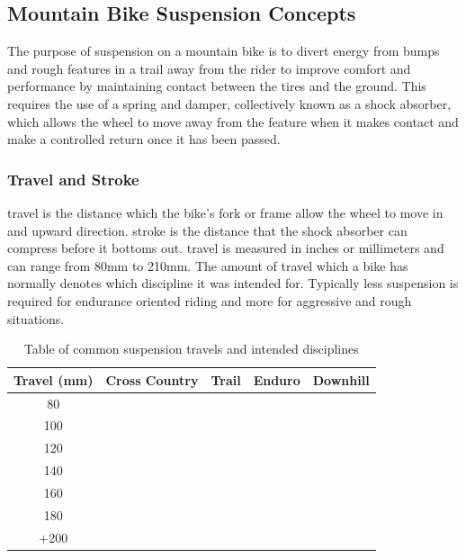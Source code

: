 	\subsection{Mountain Bike Suspension Concepts}
		The purpose of suspension on a mountain bike is to divert energy from bumps and rough features in a trail away from the rider to improve comfort and  performance by maintaining contact between the tires and the ground. This requires the use of a spring and damper, collectively known as a shock absorber, which allows the wheel to move away from the feature when it makes contact and make a controlled return once it has been passed.
	\subsubsection{Travel and Stroke} 
		\Gls{travel} is the distance which the bike's fork or frame allow the wheel to move in and upward direction. \Gls{stroke} is the distance that the shock absorber can compress before it bottoms out. \Gls{travel} is measured in inches or millimeters and can range from 80mm to 210mm. The amount of \gls{travel} which a bike has normally denotes which discipline it was intended for. Typically less suspension is required for endurance oriented riding and more for aggressive and rough situations.
		\begin{table}[h!]
		\centering
		\caption{Table of common suspension \glspl{travel} and intended disciplines}
		\label{tab:travel}
		\begin{tabular}{|c|cccc|}
			\hline
			Travel (mm)&Cross Country&Trail&Enduro&Downhill\\
			\hline
			80&\cellcolor[gray]{0.5}&&&
			\\
			100&\cellcolor[gray]{0.5}&&&
			\\
			120&\cellcolor[gray]{0.5}&\cellcolor[gray]{0.5}&&
			\\
			140&&\cellcolor[gray]{0.5}&\cellcolor[gray]{0.5}&
			\\
			160&&&\cellcolor[gray]{0.5}&
			\\
			180&&&\cellcolor[gray]{0.5}&\cellcolor[gray]{0.5}
			\\
			+200&&&&\cellcolor[gray]{0.5}\\
			\hline
		\end{tabular}
	\end{table}
